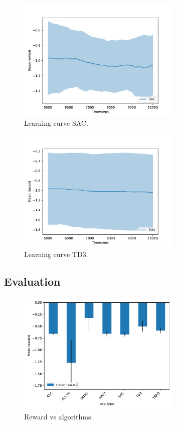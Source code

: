 \documentclass{article}
\begin{document}
\begin{figure}[H]
    \centering
    \includegraphics[width=0.7\textwidth]{../SAC.pdf}
\caption{Learning curve SAC.}
\end{figure}

\begin{figure}[H]
    \centering
    \includegraphics[width=0.7\textwidth]{../TD3.pdf}
\caption{Learning curve TD3.}
\end{figure}





\subsection{Evaluation}


\begin{figure}[H]
    \centering
    \includegraphics[width=0.7\textwidth]{../reward_by_exp_type.pdf}
\caption{Reward vs algorithms.}
\end{figure}
\end{document}
